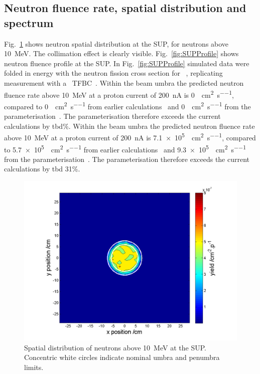 \documentclass[11pt,a4paper]{IEEEtran}
\let\MYoriglatexcaption\caption
\renewcommand{\caption}[2][\relax]{\MYoriglatexcaption[#2]{#2}}
\def\U238{\BPChem{\^{238}U}}
\begin{document}
\subsection{Neutron fluence rate, spatial distribution and spectrum}
Fig.~\ref{fig:SUPDensity} shows neutron spatial distribution at the SUP, for neutrons above \SI{10}{\MeV}.
The collimation effect is clearly visible.
Fig.~\ref{fig:SUPProfile} shows neutron fluence profile at the SUP.
In Fig.~\ref{fig:SUPProfile} simulated data were folded in energy with the neutron fission cross section for \U238~\cite{tbd}, replicating measurement with a \U238\ TFBC~\cite{Prokofiev2009}.
Within the beam umbra the predicted neutron fluence rate above \SI{10}{\MeV} at a proton current of \SI{200}{\nA} is \SI{0}{\neutron\per\cm\squared\per\second}, compared to \SI{0}{\neutron\per\cm\squared\per\second} from earlier calculations~\cite{Platt13} and \SI{0}{\neutron\per\cm\squared\per\second} from the parameterisation~\cite{Prokofiev2009}.
The parameterisation therefore exceeds the current calculations by tbd\%.
Within the beam umbra the predicted neutron fluence rate above \SI{10}{\MeV} at a proton current of \SI{200}{\nA} is \SI{7.1e5}{\neutron\per\cm\squared\per\second}, compared to \SI{5.7e5}{\neutron\per\cm\squared\per\second} from earlier calculations~\cite{Platt13} and \SI{9.3e5}{\neutron\per\cm\squared\per\second} from the parameterisation~\cite{Prokofiev2009}.
The parameterisation therefore exceeds the current calculations by tbd 31\%.

\begin{figure}[t]
    \includegraphics[width=\columnwidth]{SUP10ColSpatialDistribution10MeVRADECS.png}
    \caption{
        Spatial distribution of neutrons above \SI{10}{\MeV} at the SUP.
        Concentric white circles indicate nominal umbra and penumbra limits.
    }
    \label{fig:SUPDensity}
\end{figure}
\end{document}
